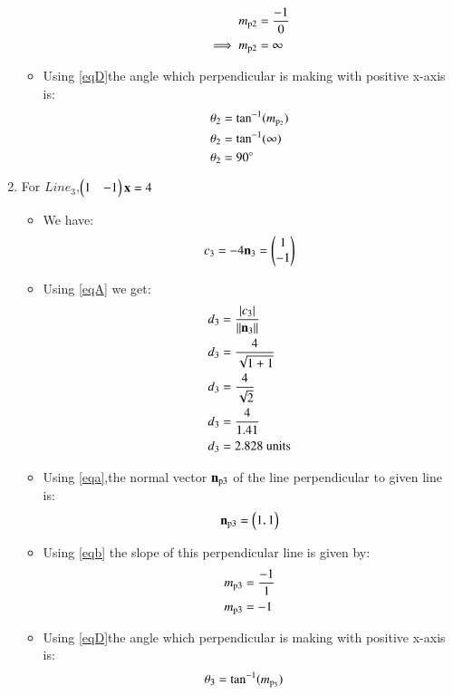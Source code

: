 \documentclass[journal,12pt,twocolumn]{IEEEtran}
\begin{document}
\begin{enumerate}
\begin{itemize}
\begin{align}
  m\textsubscript{p2}&=\frac{-{1}}{0}
  \\
  \implies m\textsubscript{p2}&=\infty 
\end{align}
\item Using \eqref{eqD}the angle which perpendicular is making with positive x-axis is:
\begin{align}
    \theta\textsubscript{2} &= \tan^{-1}( m\textsubscript{p\textsubscript{2}})
    \\
    \theta\textsubscript{2} &=\tan^{-1}(\infty)
    \\
 \theta\textsubscript{2} &= 90\degree
\end{align}
\end{itemize}
\item For $Line_3$,$\myvec{1&-1}\vec{x} =4$
\begin{itemize}
\item We have:
\begin{align}
 c\textsubscript{3}= -4 {\vec{n\textsubscript{3}}}=\myvec{1\\-1}   
\end{align}
\item Using \eqref{eqA} we get:
\begin{align}
d\textsubscript{3}&=\frac { \left| c\textsubscript{3}\right| }{\norm{\vec{n\textsubscript{3}}}}
\\
d\textsubscript{3}&=\frac{4}{\sqrt{1+1}} 
\\
d\textsubscript{3}&=\frac{4}{\sqrt{2}}
\\
d\textsubscript{3}&=\frac{4}{1.41}
\\
d\textsubscript{3}&=2.828 \text{ units}
\end{align}
\item Using \eqref{eqa},the normal vector $\vec{n\textsubscript{p3}}$ of the line perpendicular to given line is: 
\begin{align}
    \vec{n\textsubscript{p3}}=\myvec{1,1}
\end{align}
\item Using \eqref{eqb} the slope of this perpendicular line is given by:
\begin{align}
  m\textsubscript{p3}&=\frac{-1}{1}
  \\
 m\textsubscript{p3}&=-1
\end{align}
\item Using \eqref{eqD}the angle which perpendicular is making with positive x-axis is:
\begin{align}
    \theta\textsubscript{3} &= \tan^{-1}( m\textsubscript{p\textsubscript{3}})

\end{align}
\end{itemize}
\end{enumerate}
\end{document}
